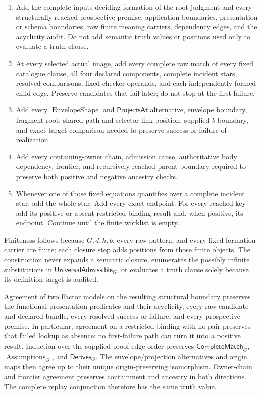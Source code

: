\documentclass[11pt,twoside]{article}
\newcommand{\Derives}{\mathsf{Derives}}
\newcommand{\CompleteMatch}{\mathsf{CompleteMatch}}
\newcommand{\UniversalAdmissible}{\mathsf{UniversalAdmissible}}
\newcommand{\ProjectsAt}{\mathsf{ProjectsAt}}
\begin{document}
\begin{enumerate}[leftmargin=2.2em]
  \item Add the complete inputs deciding formation of the root judgment and every
        structurally reached prospective premise: application boundaries,
        presentation or schema boundaries, raw finite meaning carriers, dependency
        edges, and the acyclicity audit.  Do not add semantic truth values or
        positions used only to evaluate a truth clause.
  \item At every selected actual image, add every complete raw match of every fixed
        catalogue clause, all four declared components, complete incident stars,
        resolved comparisons, fixed checker operands, and each independently
        formed child edge.  Preserve candidates that fail later; do not stop at the
        first failure.
  \item Add every \(\operatorname{EnvelopeShape}\) and \(\ProjectsAt\)
        alternative, envelope boundary, fragment root,
        shared-path and selector-link position, supplied \(b\) boundary, and exact
        target comparison needed to preserve success or failure of realization.
  \item Add every containing-owner chain, admission cause, authoritative body
        dependency, frontier, and recursively reached parent boundary required to
        preserve both positive and negative ancestry checks.
  \item Whenever one of those fixed equations quantifies over a complete incident
        star, add the whole star.  Add every exact endpoint.  For every reached key
        add its positive or absent restricted binding result and, when positive,
        its endpoint.  Continue until the finite worklist is empty.
\end{enumerate}

Finiteness follows because \(G,d,h,b\), every raw pattern, and every fixed
formation carrier are finite; each closure step adds positions from those finite
objects.  The construction never expands a semantic closure, enumerates the
possibly infinite substitutions in \(\UniversalAdmissible_G\), or evaluates a
truth clause solely because its definition target is audited.

Agreement of two Factor models on the resulting structural boundary preserves
the functional presentation predicates and their acyclicity, every raw candidate and
declared bundle, every resolved success or failure, and every prospective premise.
In particular, agreement on a restricted binding with no pair preserves that
failed lookup as absence; no first-failure path can turn it into a positive result.
Induction over the supplied proof-edge order preserves
\(\CompleteMatch_G\), \(\operatorname{Assumptions}_G\), and \(\Derives_G\).
The envelope/projection alternatives and origin maps then agree up to their unique
origin-preserving isomorphism.  Owner-chain and frontier agreement preserves
containment and ancestry in both directions.  The complete replay conjunction
therefore has the same truth value.
\end{document}
